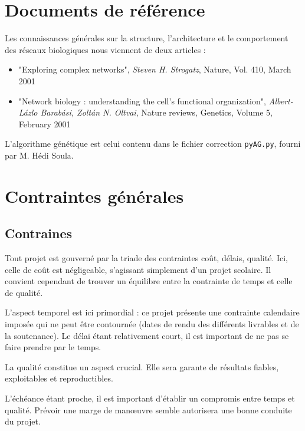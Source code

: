 \section{Documents de référence}
Les connaissances générales sur la structure, l'architecture et le comportement des réseaux biologiques nous viennent de deux articles :

\begin{itemize}
	\item "Exploring complex networks", \textit{Steven H. Strogatz}, Nature, Vol. 410, March 2001
	\item "Network biology : understanding the cell's functional organization", \textit{Albert-L\'{a}zlo Barab\'{a}si, Zolt\'{a}n N. Oltvai}, Nature reviews, Genetics, Volume 5, February 2001\medskip
\end{itemize}


L'algorithme génétique est celui contenu dans le fichier correction \texttt{pyAG.py}, fourni par M. Hédi Soula.

\section{Contraintes générales}

\subsection{Contraines}
Tout projet est gouverné par la triade des contraintes coût, délais, qualité. Ici, celle de coût est négligeable, s'agissant simplement d'un projet scolaire. Il convient cependant de trouver un équilibre entre la contrainte de temps et celle de qualité.

L'aspect temporel est ici primordial : ce projet présente une contrainte calendaire imposée qui ne peut être contournée (dates de rendu des différents livrables et de la soutenance). Le délai étant relativement court, il est important de ne pas se faire prendre par le temps.

La qualité constitue un aspect crucial. Elle sera garante de résultats fiables, exploitables et reproductibles. 

L'échéance étant proche, il est important d'établir un compromis entre temps et qualité. Prévoir une marge de manœuvre semble autorisera une bonne conduite du projet.\\


